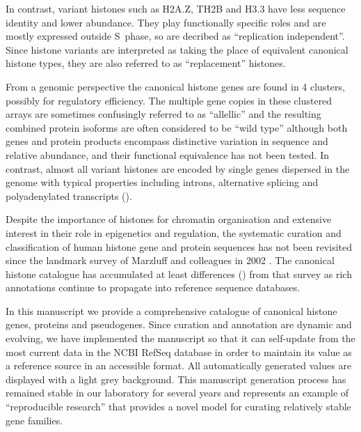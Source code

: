   In contrast, variant histones such as H2A.Z, TH2B and H3.3 have
  less sequence identity and lower abundance.
  They play functionally specific roles and are mostly expressed outside S~phase,
  so are decribed as ``replication independent''.
  Since histone variants are interpreted as taking the place of equivalent canonical histone types,
  they are also referred to as ``replacement'' histones.

  From a genomic perspective the canonical histone genes are found in 4 clusters,
  possibly for regulatory efficiency.
  The multiple gene copies in these clustered arrays are sometimes confusingly referred to as ``allellic''
  and the resulting combined protein isoforms are often considered to be ``wild type''
  although both genes and protein products encompass distinctive variation in sequence and relative abundance,
  and their functional equivalence has not been tested.
  In contrast, almost all variant histones are encoded by single genes dispersed in the genome
  with typical properties including introns, alternative splicing
  and polyadenylated transcripts ().

  Despite the importance of histones for chromatin organisation and extensive interest
  in their role in epigenetics and regulation, the systematic curation and classification of human histone
  gene and protein sequences has not been revisited
  since the landmark survey of Marzluff and colleagues in 2002 \citep{Marzluff02}.
  The canonical histone catalogue has accumulated at least
   differences ()
  from that survey as rich annotations continue to propagate into reference sequence databases.

  In this manuscript we provide a comprehensive catalogue
  of canonical histone genes, proteins and pseudogenes.
  Since curation and annotation are dynamic and evolving,
  we have implemented the manuscript so that it can
  self-update from the most current data in the NCBI RefSeq database
  in order to maintain its value as a reference source in an accessible format.
  All automatically generated values are displayed with a light grey background.
  This manuscript generation process has remained stable in our laboratory for several years
  and represents an example of ``reproducible research'' \citep{Claerbout2000}
  that provides a novel model for curating relatively stable gene families.

